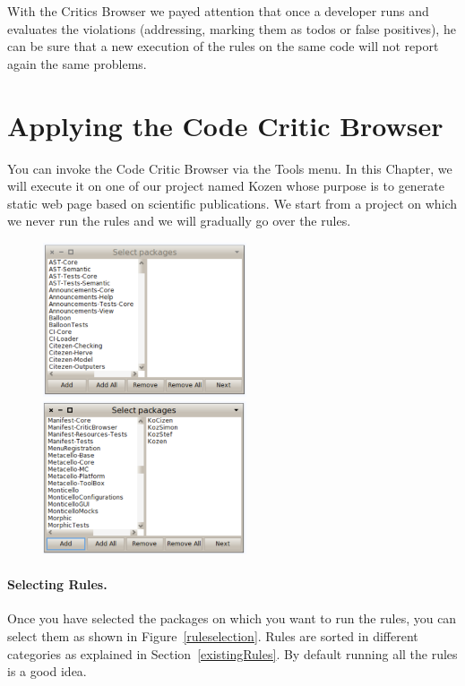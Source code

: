 \documentclass[a4paper,10pt,twoside]{book}
\begin{document}
With the Critics Browser we payed attention that once a developer runs and evaluates the violations (\ie addressing, marking them as todos or false positives), he can be sure that a new execution of the rules on the same code will not report again the same problems. 



\section{Applying the Code Critic Browser}

You can invoke the Code Critic Browser via the Tools menu. In this Chapter, we will execute it on one of our project named Kozen whose purpose is to generate static web page based on scientific publications. We start from a project on which we never run the rules and we will gradually go over the rules.
\begin{figure}[h]
\centering
\includegraphics[width=6cm]{selectingPackage}\includegraphics[width=6cm]{selectingPackage2} 
\end{figure}


\paragraph{Selecting Rules.}
Once you have selected the packages on which you want to run the rules, you can select them as shown in Figure~\ref{ruleselection}. Rules are sorted in different categories as explained in Section~\ref{existingRules}. By default running all the rules is a good idea.
\end{document}
